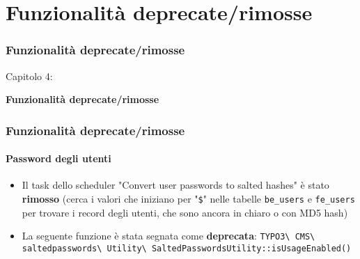 %

\section{Funzionalità deprecate/rimosse}
\begin{frame}[fragile]
	\frametitle{Funzionalità deprecate/rimosse}

	\begin{center}\huge{Capitolo 4:}\end{center}
	\begin{center}\huge{\color{typo3darkgrey}\textbf{Funzionalità deprecate/rimosse}}\end{center}

\end{frame}


\begin{frame}[fragile]
	\frametitle{Funzionalità deprecate/rimosse}
	\framesubtitle{Password degli utenti}

	\begin{itemize}
		\item Il task dello scheduler "Convert user passwords to salted hashes"
			è stato \textbf{rimosso}\newline
			\smaller
				(cerca i valori che iniziano per "\texttt{\$}" nelle tabelle
				\texttt{be\_users} e \texttt{fe\_users} per trovare i record degli utenti,
				che sono ancora in chiaro o con MD5 hash)
			\normalsize
		\item La seguente funzione è stata segnata come \textbf{deprecata}:\newline
			\fontsize{7.5pt}{10}\selectfont
				\texttt{TYPO3\textbackslash
					CMS\textbackslash
					saltedpasswords\textbackslash
					Utility\textbackslash
					SaltedPasswordsUtility::isUsageEnabled()}
			\normalsize

	\end{itemize}

\end{frame}

